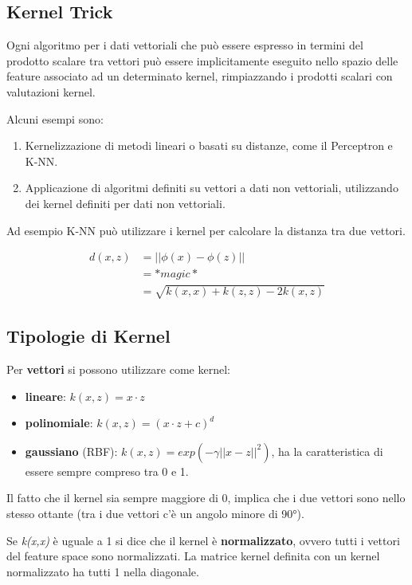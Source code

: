 \subsection{Kernel Trick}\label{kernel-trick}

Ogni algoritmo per i dati vettoriali che può essere espresso in termini
del prodotto scalare tra vettori può essere implicitamente eseguito nello
spazio delle feature associato ad un determinato kernel, rimpiazzando i
prodotti scalari con valutazioni kernel.

Alcuni esempi sono:
\begin{enumerate}
\item
  Kernelizzazione di metodi lineari o basati su distanze, come il
  Perceptron e K-NN.
\item
  Applicazione di algoritmi definiti su vettori a dati non vettoriali,
  utilizzando dei kernel definiti per dati non vettoriali.
\end{enumerate}

Ad esempio K-NN può utilizzare i kernel per calcolare la distanza tra
due vettori.

\begin{align*}
d(x,z) &= ||\phi(x) - \phi(z)|| \\
          &= *magic* \\
          &= \sqrt{k(x,x) + k(z,z) - 2k(x,z)}
\end{align*}

\subsection{Tipologie di Kernel}\label{tipologie-di-kernel}

Per \textbf{vettori} si possono utilizzare come kernel:

\begin{itemize}
\item
  \textbf{lineare}: $k(x,z) = x \cdot z$
\item
  \textbf{polinomiale}: $k(x,z) = (x \cdot z + c)^d$
\item
  \textbf{gaussiano} (RBF): $k(x,z) = exp(-\gamma||x-z||^2)$, ha la
  caratteristica di essere sempre compreso tra 0 e 1.
\end{itemize}

Il fatto che il kernel sia sempre maggiore di 0, implica che i due
vettori sono nello stesso ottante (tra i due vettori c'è un angolo
minore di 90°).

Se \emph{k(x,x)} è uguale a 1 si dice che il kernel è
\textbf{normalizzato}, ovvero tutti i vettori del feature space sono
normalizzati. La matrice kernel definita con un kernel normalizzato ha
tutti 1 nella diagonale.


